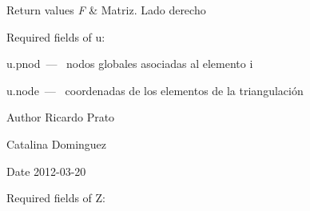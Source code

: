 \begin{DoxyRetVals}{Return values}
{\em F} & Matriz. Lado derecho\\
\hline
\end{DoxyRetVals}
\begin{DoxyParagraph}{Required fields of u\-:}
\begin{DoxyItemize}
\item {\ttfamily u.\-pnod~---~} nodos globales asociadas al elemento i \item {\ttfamily u.\-node~---~} coordenadas de los elementos de la triangulación \end{DoxyItemize}

\end{DoxyParagraph}
\begin{DoxyAuthor}{Author}
Ricardo Prato 

Catalina Dominguez 
\end{DoxyAuthor}
\begin{DoxyDate}{Date}
2012-\/03-\/20
\end{DoxyDate}
\begin{DoxyParagraph}{Required fields of Z\-:}

\end{DoxyParagraph}
